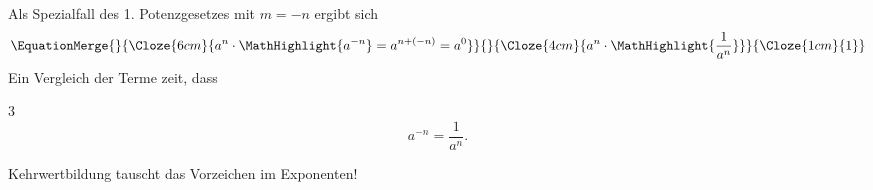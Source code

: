 \begin{RemarkBox}
  Als Spezialfall des 1. Potenzgesetzes mit $m=-n$ ergibt sich
  \[
  \EquationMerge
    {}
    {\Cloze{6cm}{a^n\cdot\MathHighlight{a^{-n}}=a^{n+(-n)}=a^0}}
    {}
    {\Cloze{4cm}{a^n\cdot\MathHighlight{\frac{1}{a^n}}}}
    {\Cloze{1cm}{1}}
  \]
  Ein Vergleich der Terme zeit, dass
  \begin{ClozeArea}[8]{3}
    \[
      a^{-n}=\frac{1}{a^n}.
    \]
  \end{ClozeArea}
  Kehrwertbildung tauscht das Vorzeichen im Exponenten!
\end{RemarkBox}

